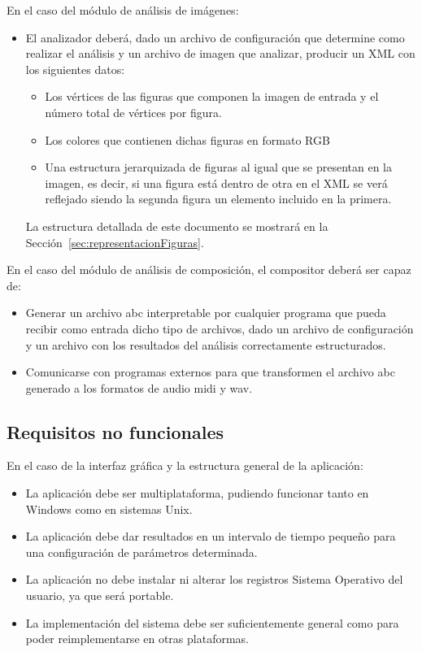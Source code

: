  
 En el caso del módulo de análisis de imágenes:
 \begin{itemize}
	\item El analizador deberá, dado un archivo de configuración que determine como realizar el análisis y un archivo de imagen que analizar, producir un XML con los siguientes datos:
	\begin{itemize}
		\item Los vértices de las figuras que componen la imagen de entrada y el número total de vértices por figura.
		\item Los colores que contienen dichas figuras en formato RGB
		\item Una estructura jerarquizada de figuras al igual que se presentan en la imagen, es decir, si una figura está dentro de otra en el XML se verá reflejado siendo la segunda figura un elemento incluido en la primera.
	\end{itemize}
	La estructura detallada de este documento se mostrará en la Sección~\ref{sec:representacionFiguras}.
 \end{itemize}
  En el caso del módulo de análisis de composición, el compositor deberá ser capaz de:
 \begin{itemize}
	\item Generar un archivo abc interpretable por cualquier programa que pueda recibir como entrada dicho tipo de archivos, dado un archivo de configuración y un archivo con los resultados del análisis correctamente estructurados.
	\item Comunicarse con programas externos para que transformen el archivo abc generado a los formatos de audio midi y wav.
 \end{itemize}
 
\subsection{Requisitos no funcionales}

En el caso de la interfaz gráfica y la estructura general de la aplicación:

\begin{itemize}
	\item La aplicación debe ser multiplataforma, pudiendo funcionar tanto en Windows como en sistemas Unix.	
	\item La aplicación debe dar resultados en un intervalo de tiempo pequeño para una configuración de parámetros determinada.
	\item La aplicación no debe instalar ni alterar los registros Sistema Operativo del usuario, ya que será portable.
	\item La implementación del sistema debe ser suficientemente general como para poder reimplementarse en otras plataformas.
\end{itemize}

